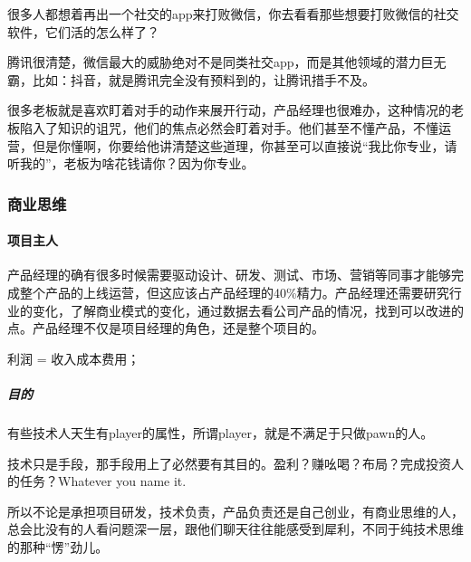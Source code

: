 \documentclass[letterpaper,10pt,english]{sphinxmanual}
\begin{document}
很多人都想着再出一个社交的app来打败微信，你去看看那些想要打败微信的社交软件，它们活的怎么样了？

腾讯很清楚，微信最大的威胁绝对不是同类社交app，而是其他领域的潜力巨无霸，比如：抖音，就是腾讯完全没有预料到的，让腾讯措手不及。

很多老板就是喜欢盯着对手的动作来展开行动，产品经理也很难办，这种情况的老板陷入了知识的诅咒，他们的焦点必然会盯着对手。他们甚至不懂产品，不懂运营，但是你懂啊，你要给他讲清楚这些道理，你甚至可以直接说“我比你专业，请听我的”，老板为啥花钱请你？因为你专业。


\subsubsection{商业思维}
\label{\detokenize{chapter_idea/business:id1}}\label{\detokenize{chapter_idea/business::doc}}

\paragraph{项目主人}
\label{\detokenize{chapter_idea/business:id2}}
产品经理的确有很多时候需要驱动设计、研发、测试、市场、营销等同事才能够完成整个产品的上线运营，但这应该占产品经理的40\%精力。产品经理还需要研究行业的变化，了解商业模式的变化，通过数据去看公司产品的情况，找到可以改进的点。产品经理不仅是项目经理的角色，还是整个项目的。%
\begin{footnote}[396]\sphinxAtStartFootnote
{}
%
\end{footnote}

利润 = 收入\sphinxhyphen{}成本\sphinxhyphen{}费用；


\subparagraph{目的}
\label{\detokenize{chapter_idea/business:id3}}
有些技术人天生有player的属性，所谓player，就是不满足于只做pawn的人。

技术只是手段，那手段用上了必然要有其目的。盈利？赚吆喝？布局？完成投资人的任务？Whatever
you name it.

所以不论是承担项目研发，技术负责，产品负责还是自己创业，有商业思维的人，总会比没有的人看问题深一层，跟他们聊天往往能感受到犀利，不同于纯技术思维的那种“愣”劲儿。
%
\begin{footnote}[397]\sphinxAtStartFootnote
{}
%
\end{footnote}
\end{document}
